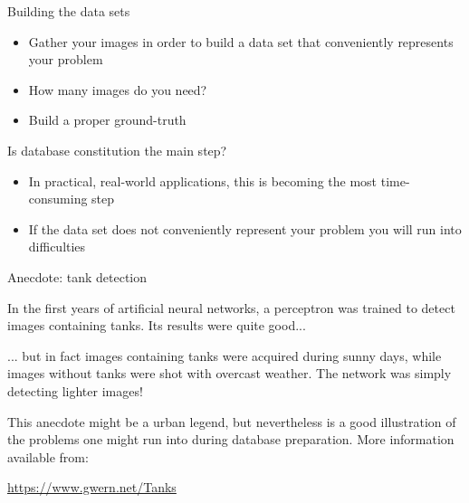 \documentclass[xcolor=pdftex,dvipsnames,table,mathserif]{beamer}
\begin{document}
\begin{frame}{Building the data sets}
  \begin{itemize}
  \item Gather your images in order to build a data set that conveniently represents your problem
  \item How many images do you need?
  \item Build a proper ground-truth
  \end{itemize}

  \pause

  \begin{alertblock}{Is database constitution the main step?}
    \begin{itemize}
    \item In practical, real-world applications, this is becoming the most time-consuming step
    \item If the data set does not conveniently represent your problem you will run into difficulties
    \end{itemize}

  \end{alertblock}

\end{frame}

\begin{frame}{Anecdote: tank detection}

  In the first years of artificial neural networks, a perceptron was trained to detect images containing tanks. Its results were quite good...
  \vspace{1em}

  \pause

  ... but in fact images containing tanks were acquired during sunny days, while images without tanks were shot with overcast weather. The network was simply detecting lighter images!
  \vspace{1em}

  \pause

  This anecdote might be a urban legend, but nevertheless is a good illustration of the problems one might run into during database preparation. More information available from:

  \centering
  \url{https://www.gwern.net/Tanks}
\end{frame}

\end{document}
